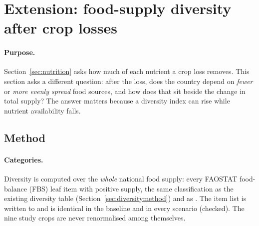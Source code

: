 \section{Extension: food-supply diversity after crop losses}\label{sec:divloss}
\paragraph{Purpose.} Section~\ref{sec:nutrition} asks how much of each nutrient a crop loss removes. This section asks
a different question: after the loss, does the country depend on \emph{fewer} or \emph{more evenly spread} food
sources, and how does that sit beside the change in total supply? The answer matters because a diversity index
can rise while nutrient availability falls.

\subsection{Method}
\paragraph{Categories.} Diversity is computed over the \emph{whole} national food supply: every FAOSTAT food-balance
(FBS) leaf item with positive supply, the same classification as the existing diversity table
(Section~\ref{sec:diversitymethod}) and as \citet{remans2014}. The item list is written to 
and is identical in the baseline and in every scenario (checked). The nine study crops are never renormalised
among themselves.

